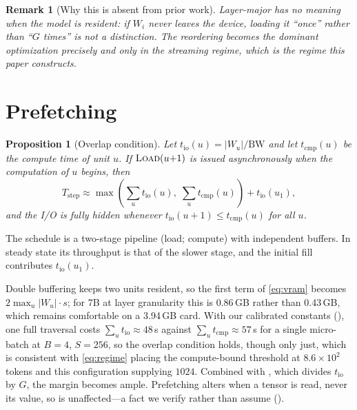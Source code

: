 \documentclass[journal]{IEEEtran}
\newtheorem{proposition}[theorem]{Proposition}
\newtheorem{remark}[theorem]{Remark}
\newcommand{\Wu}{\lvert W_u \rvert}
\begin{document}
\begin{remark}[Why this is absent from prior work]
Layer-major has no meaning when the model is resident: if $W_i$ never leaves the device, loading it
``once'' rather than ``$G$ times'' is not a distinction. The reordering becomes the dominant
optimization precisely and only in the streaming regime, which is the regime this paper
constructs.
\end{remark}

\section{Prefetching}
\label{sec:prefetch}

\begin{proposition}[Overlap condition]
\label{prop:prefetch}
Let $t_{\text{io}}(u) = \Wu / \mathrm{BW}$ and let $t_{\text{cmp}}(u)$ be the compute time of unit
$u$. If $\textsc{Load}(u{+}1)$ is issued asynchronously when the computation of $u$ begins, then
\begin{equation}
T_{\text{step}} \approx \max\!\left(\textstyle\sum_u t_{\text{io}}(u),\; \sum_u t_{\text{cmp}}(u)\right)
+ t_{\text{io}}(u_1),
\end{equation}
and the I/O is fully hidden whenever $t_{\text{io}}(u{+}1) \le t_{\text{cmp}}(u)$ for all $u$.
\end{proposition}

\begin{IEEEproof}
The schedule is a two-stage pipeline (load; compute) with independent buffers. In steady state its
throughput is that of the slower stage, and the initial fill contributes $t_{\text{io}}(u_1)$.
\end{IEEEproof}

Double buffering keeps two units resident, so the first term of \eqref{eq:vram} becomes
$2\max_u \Wu \cdot s$; for 7B at layer granularity this is 0.86\,GB rather than 0.43\,GB, which
remains comfortable on a 3.94\,GB card. With our calibrated constants (), one full
traversal costs $\sum_u t_{\text{io}} \approx 48$\,s against $\sum_u t_{\text{cmp}} \approx 57$\,s
for a single micro-batch at $B{=}4$, $S{=}256$, so the overlap condition holds, though only just,
which is consistent with \eqref{eq:regime} placing the compute-bound threshold at
$8.6\times10^{2}$ tokens and this configuration supplying $1024$. Combined with ,
which divides $t_{\text{io}}$ by $G$, the margin becomes ample. Prefetching alters when a tensor is read, never its value, so
 is unaffected---a fact we verify rather than assume ().
\end{document}
